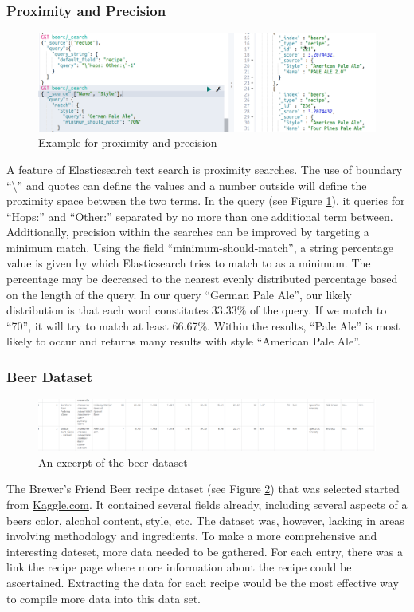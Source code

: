 \documentclass[bibliography=totoc]{article}
\begin{document}
\subsubsection{Proximity and Precision}
\begin{figure}
    \includegraphics[height=0.3\textwidth]{beer_proximity.png}
    \caption{\label{beer_proximity}Example for proximity and precision} 
 \end{figure}
 A feature of Elasticsearch text search is proximity searches. 
 The use of boundary “\textbackslash” and quotes can define the values and a 
 number outside will define the proximity space between the two 
 terms. In the query (see Figure \ref{beer_proximity}), it queries for “Hops:” and “Other:” 
 separated by no more than one additional term between. 
 Additionally, precision within the searches can be improved by 
 targeting a minimum match. Using the field “minimum-should-match”, 
 a string percentage value is given by which Elasticsearch tries to 
 match to as a minimum. The 
 percentage may be decreased to the nearest evenly distributed percentage 
 based on the length of the query. 
 In our query “German Pale Ale”, our likely distribution is 
 that each word constitutes 33.33\% of the query. 
 If we match to “70”, it will try to match at least 66.67\%. 
 Within the results, “Pale Ale” is most likely to occur and returns 
 many results with style “American Pale Ale”.

 \subsubsection{Beer Dataset}
 \begin{figure}
    \includegraphics[height=0.2\textwidth]{beer_dataset.png}
    \caption{\label{beer_dataset}An excerpt of the beer dataset} 
 \end{figure}
 The Brewer’s Friend Beer recipe dataset (see Figure \ref{beer_dataset}) that was selected started 
 from \href{https://www.kaggle.com/}{Kaggle.com}. It contained several fields already, 
 including several aspects of a beers color, alcohol content, 
 style, etc. The dataset was, however, lacking in areas 
 involving methodology and ingredients. To make a more 
 comprehensive and interesting dateset, more data needed to be 
 gathered. For each entry, there was a link the recipe page where 
 more information about the recipe could be ascertained. 
 Extracting the data for each recipe would be the most effective 
 way to compile more data into this data set.
\end{document}
